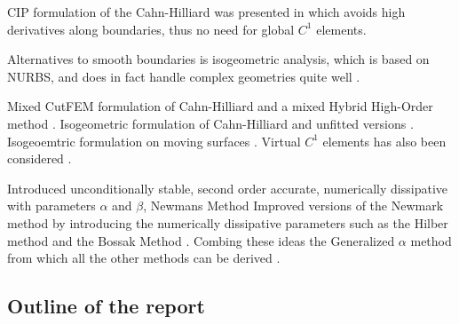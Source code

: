 CIP formulation of the Cahn-Hilliard was presented in \cite{wells2006discontinuous} which avoids high derivatives along boundaries, thus no need for global $C^{1}$ elements.

Alternatives to smooth boundaries is isogeometric analysis, which is based on NURBS, and does in fact handle complex geometries quite well \cite{hughes2005isogeometric}.

Mixed CutFEM formulation of Cahn-Hilliard \cite{karatzas2021reduced} and a mixed Hybrid High-Order method \cite{chave2016hybrid}. Isogeometric formulation of Cahn-Hilliard \cite{kastner2016isogeometric, gomez2008isogeometric} and unfitted versions \cite{zhao2017variational}. Isogeoemtric formulation on moving
surfaces \cite{zimmermann2019isogeometric}. Virtual $C^{1}$  elements has also been considered \cite{antonietti2016c}.

Introduced unconditionally stable, second order accurate, numerically dissipative with parameters $\alpha$ and $ \beta $,  Newmans Method \cite{newmark1959method}
Improved versions of the Newmark method by introducing the numerically dissipative parameters such as the Hilber method and the Bossak Method \cite{hilber1977improved, wood1980alpha}. Combing these ideas the Generalized $\alpha $ method from which all the other methods can be derived \cite{chung1993time}.






\subsection{Outline of the report}%
\label{sub:outline_of_the_report}


